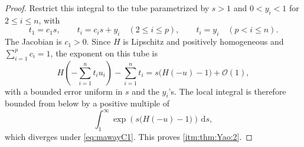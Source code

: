 \begin{proof}
    Restrict this integral to the tube parametrized by $s>1$ and $0<y_i<1$ for $2\leq i\leq n$, with
    \[
        t_1=c_1s,\qquad
        t_i=c_is+y_i\quad(2\leq i\leq p),\qquad
        t_i=y_i\quad(p<i\leq n).
    \]
    The Jacobian is $c_1>0$. Since $H$ is Lipschitz and positively homogeneous and $\sum_{i=1}^p c_i=1$, the exponent on this tube is
    \[
        H\left(-\sum_{i=1}^n t_i u_i\right)-\sum_{i=1}^n t_i
        =s\bigl(H(-u)-1\bigr)+\mathcal{O}(1),
    \]
    with a bounded error uniform in $s$ and the $y_i$'s. The local integral is therefore bounded from below by a positive multiple of
    \[
        \int_1^{\infty}\exp\left(s\bigl(H(-u)-1\bigr)\right)\,\mathrm{d}s,
    \]
    which diverges under \eqref{eq:mawayC1}. This proves \ref{itm:thm:Yao:2}.
\end{proof}


